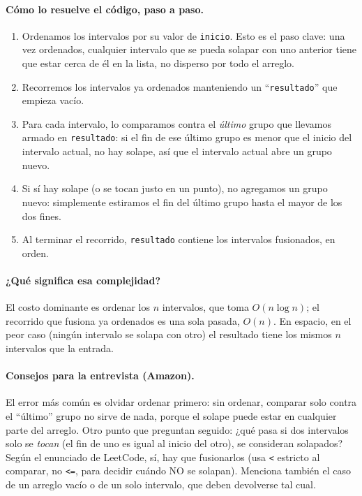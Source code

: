 \paragraph{Cómo lo resuelve el código, paso a paso.}
\begin{enumerate}
  \item Ordenamos los intervalos por su valor de \texttt{inicio}. Esto es
        el paso clave: una vez ordenados, cualquier intervalo que se pueda
        solapar con uno anterior tiene que estar cerca de él en la lista, no
        disperso por todo el arreglo.
  \item Recorremos los intervalos ya ordenados manteniendo un
        ``\texttt{resultado}'' que empieza vacío.
  \item Para cada intervalo, lo comparamos contra el \emph{último} grupo que
        llevamos armado en \texttt{resultado}: si el fin de ese último grupo
        es menor que el inicio del intervalo actual, no hay solape, así que
        el intervalo actual abre un grupo nuevo.
  \item Si sí hay solape (o se tocan justo en un punto), no agregamos un
        grupo nuevo: simplemente estiramos el fin del último grupo hasta el
        mayor de los dos fines.
  \item Al terminar el recorrido, \texttt{resultado} contiene los intervalos
        fusionados, en orden.
\end{enumerate}




\paragraph{¿Qué significa esa complejidad?} El costo dominante es ordenar
los $n$ intervalos, que toma $O(n \log n)$; el recorrido que fusiona ya
ordenados es una sola pasada, $O(n)$. En espacio, en el peor caso (ningún
intervalo se solapa con otro) el resultado tiene los mismos $n$ intervalos
que la entrada.

\paragraph{Consejos para la entrevista (Amazon).} El error más común es
olvidar ordenar primero: sin ordenar, comparar solo contra el ``último''
grupo no sirve de nada, porque el solape puede estar en cualquier parte del
arreglo. Otro punto que preguntan seguido: ¿qué pasa si dos intervalos solo
se \emph{tocan} (el fin de uno es igual al inicio del otro), se consideran
solapados? Según el enunciado de LeetCode, sí, hay que fusionarlos (usa
\texttt{<} estricto al comparar, no \texttt{<=}, para decidir cuándo NO se
solapan). Menciona también el caso de un arreglo vacío o de un solo
intervalo, que deben devolverse tal cual.
